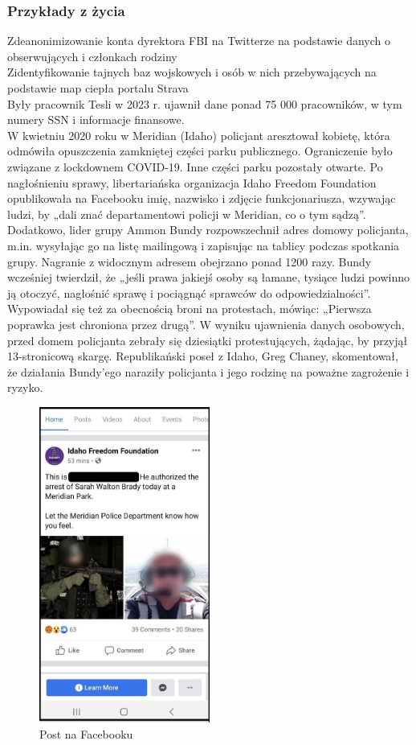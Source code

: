 \subsubsection{Przykłady z życia}
Zdeanonimizowanie konta dyrektora FBI na Twitterze na podstawie danych o obserwujących i członkach rodziny\\
Zidentyfikowanie tajnych baz wojskowych i osób w nich przebywających na podstawie map ciepła portalu Strava\\
Były pracownik Tesli w 2023 r. ujawnił dane ponad 75 000 pracowników, w tym numery SSN i informacje finansowe.\\

W kwietniu 2020 roku w Meridian (Idaho) policjant aresztował kobietę, która odmówiła opuszczenia zamkniętej części parku publicznego. Ograniczenie było związane z lockdownem COVID-19. Inne części parku pozostały otwarte.
Po nagłośnieniu sprawy, libertariańska organizacja Idaho Freedom Foundation opublikowała na Facebooku imię, nazwisko i zdjęcie funkcjonariusza, wzywając ludzi, by „dali znać departamentowi policji w Meridian, co o tym sądzą”.
Dodatkowo, lider grupy Ammon Bundy rozpowszechnił adres domowy policjanta, m.in. wysyłając go na listę mailingową i zapisując na tablicy podczas spotkania grupy. Nagranie z widocznym adresem obejrzano ponad 1200 razy.
Bundy wcześniej twierdził, że „jeśli prawa jakiejś osoby są łamane, tysiące ludzi powinno ją otoczyć, nagłośnić sprawę i pociągnąć sprawców do odpowiedzialności”. Wypowiadał się też za obecnością broni na protestach, mówiąc: „Pierwsza poprawka jest chroniona przez drugą”.
W wyniku ujawnienia danych osobowych, przed domem policjanta zebrały się dziesiątki protestujących, żądając, by przyjął 13-stronicową skargę.
Republikański poseł z Idaho, Greg Chaney, skomentował, że działania Bundy'ego naraziły policjanta i jego rodzinę na poważne zagrożenie i ryzyko.

\begin{figure}[H]
  \centering
  \includegraphics[width=0.5\textwidth]{images/officer.jpg}
  \caption{Post na Facebooku}
  \label{fig:officer}
\end{figure} 

